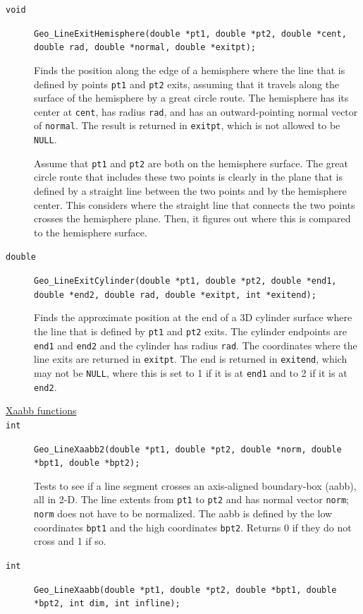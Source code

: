 \documentclass[11pt]{article}
\newcommand {\ttt} {\texttt}
\begin{document}
\begin{description}
\item[\ttt{void}]
\ttt{Geo\_LineExitHemisphere(double *pt1, double *pt2, double *cent, double rad, double *normal, double *exitpt);}

Finds the position along the edge of a hemisphere where the line that is defined by points \ttt{pt1} and \ttt{pt2} exits, assuming that it travels along the surface of the hemisphere by a great circle route. The hemisphere has its center at \ttt{cent}, has radius \ttt{rad}, and has an outward-pointing normal vector of \ttt{normal}. The result is returned in \ttt{exitpt}, which is not allowed to be \ttt{NULL}.

Assume that \ttt{pt1} and \ttt{pt2} are both on the hemisphere surface. The great circle route that includes these two points is clearly in the plane that is defined by a straight line between the two points and by the hemisphere center. This considers where the straight line that connects the two points crosses the hemisphere plane. Then, it figures out where this is compared to the hemisphere surface.

\item[\ttt{double}]
\ttt{Geo\_LineExitCylinder(double *pt1, double *pt2, double *end1, double *end2, double rad, double *exitpt, int *exitend);}

Finds the approximate position at the end of a 3D cylinder surface where the line that is defined by \ttt{pt1} and \ttt{pt2} exits. The cylinder endpoints are \ttt{end1} and \ttt{end2} and the cylinder has radius \ttt{rad}. The coordinates where the line exits are returned in \ttt{exitpt}. The end is returned in \ttt{exitend}, which may not be \ttt{NULL}, where this is set to 1 if it is at \ttt{end1} and to 2 if it is at \ttt{end2}.

\item[\underline{Xaabb functions}]

\item[\ttt{int}]
\ttt{Geo\_LineXaabb2(double *pt1, double *pt2, double *norm, double *bpt1, double *bpt2);}

Tests to see if a line segment crosses an axis-aligned boundary-box (aabb), all in 2-D. The line extents from \ttt{pt1} to \ttt{pt2} and has normal vector \ttt{norm}; \ttt{norm} does not have to be normalized. The aabb is defined by the low coordinates \ttt{bpt1} and the high coordinates \ttt{bpt2}. Returns 0 if they do not cross and 1 if so.

\item[\ttt{int}]
\ttt{Geo\_LineXaabb(double *pt1, double *pt2, double *bpt1, double *bpt2, int dim, int infline);}


\end{description}
\end{document}
